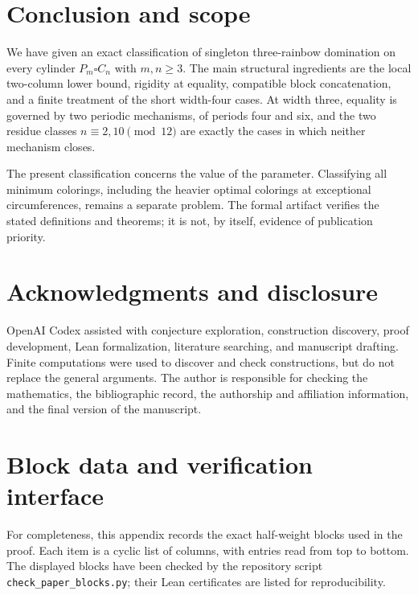 \documentclass[11pt]{article}
\theoremstyle{definition}
\theoremstyle{remark}
\begin{document}
\section{Conclusion and scope}

We have given an exact classification of singleton three-rainbow domination on every cylinder $P_m\square C_n$ with $m,n\geq 3$. The main structural ingredients are the local two-column lower bound, rigidity at equality, compatible block concatenation, and a finite treatment of the short width-four cases. At width three, equality is governed by two periodic mechanisms, of periods four and six, and the two residue classes $n\equiv 2,10\pmod {12}$ are exactly the cases in which neither mechanism closes.

The present classification concerns the value of the parameter. Classifying all minimum colorings, including the heavier optimal colorings at exceptional circumferences, remains a separate problem. The formal artifact verifies the stated definitions and theorems; it is not, by itself, evidence of publication priority.

\section*{Acknowledgments and disclosure}

OpenAI Codex assisted with conjecture exploration, construction discovery, proof development, Lean formalization, literature searching, and manuscript drafting. Finite computations were used to discover and check constructions, but do not replace the general arguments. The author is responsible for checking the mathematics, the bibliographic record, the authorship and affiliation information, and the final version of the manuscript.




\appendix
\section{Block data and verification interface}\label{app:blocks}

For completeness, this appendix records the exact half-weight blocks used in the proof. Each item is a cyclic list of columns, with entries read from top to bottom. The displayed blocks have been checked by the repository script \texttt{check\_paper\_blocks.py}; their Lean certificates are listed for reproducibility.
\end{document}
